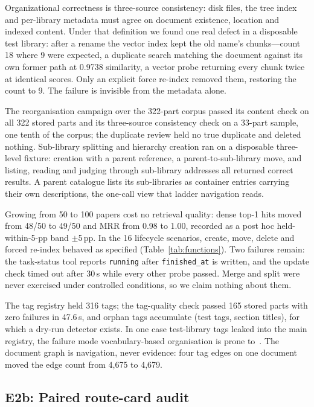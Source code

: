 Organizational correctness is three-source consistency: disk files, the tree
index and per-library metadata must agree on document existence, location and
indexed content. Under that definition we found one real defect in a
disposable test library: after a rename the vector index kept the old name's
chunks---count 18 where 9 were expected, a duplicate search matching the
document against its own former path at 0.9738 similarity, a vector probe
returning every chunk twice at identical scores. Only an explicit force
re-index removed them, restoring the count to 9. The failure is invisible from
the metadata alone.

The reorganisation campaign over the 322-part corpus passed its content
check on all 322 stored parts and its three-source consistency check on a
33-part sample, one tenth of the corpus; the duplicate review held no true
duplicate and deleted nothing. Sub-library splitting and hierarchy
creation ran on a disposable three-level fixture: creation with a parent
reference, a parent-to-sub-library move, and listing, reading and judging
through sub-library addresses all returned correct results. A parent catalogue
lists its sub-libraries as container entries carrying their own descriptions,
the one-call view that ladder navigation reads.

Growing from 50 to 100 papers cost no retrieval quality: dense top-1 hits moved
from 48/50 to 49/50 and MRR from 0.98 to 1.00, recorded as a post hoc
held-within-5-pp band
$\pm$5\,pp. In the 16 lifecycle scenarios, create, move, delete and forced
re-index behaved as specified (Table~\ref{tab:functions}). Two failures remain: the task-status
tool reports \texttt{running} after \texttt{finished\_at} is written, and the
update check timed out after 30\,s while every other probe passed. Merge and
split were never exercised under controlled conditions, so we claim nothing
about them.

The tag registry held 316 tags; the tag-quality check passed 165
stored parts with zero failures in 47.6\,s, and orphan tags accumulate (test tags,
section titles), for which a dry-run detector exists. In one case test-library
tags leaked into the main registry, the failure mode vocabulary-based
organisation is prone to~\cite{golder-tagging-2006}. The document graph is
navigation, never evidence: four tag edges on one document moved the edge count
from 4{,}675 to 4{,}679.

\subsection{E2b: Paired route-card audit}
\label{sec:routing-audit}


